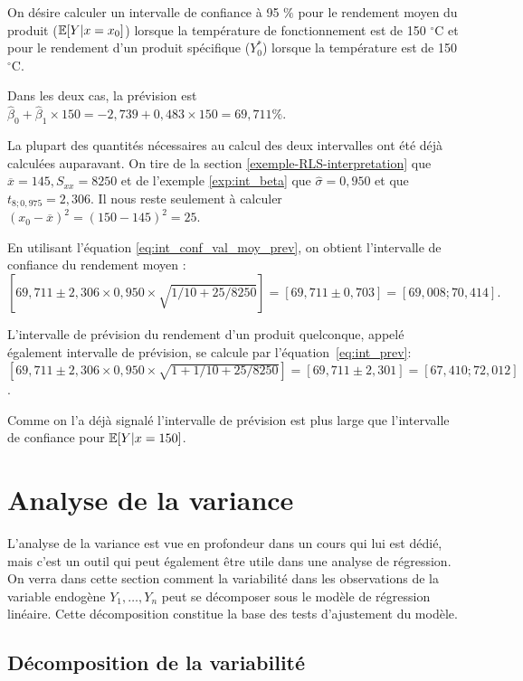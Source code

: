 \begin{exemple}
On désire calculer un intervalle de confiance à 95 $\%$ pour le rendement moyen du produit ($\mathbb{E}[Y|x=x_0]$) lorsque la température de fonctionnement est de 150 $^{\circ}\mathrm{C}$ et pour le rendement d'un produit spécifique (${Y}_0^*$) lorsque la température est de 150 $^{\circ}\mathrm{C}$.

Dans les deux cas, la prévision est $\hat\beta_0+ \hat\beta_1\times150 =-2,739+0,483\times 150=69,711 \%$.

La plupart des quantités nécessaires au calcul des deux intervalles ont été déjà calculées auparavant. On tire de la section \ref{exemple-RLS-interpretation}  que $\overline x=145, S_{xx}=8250$ et de l'exemple \ref{exp:int_beta} que $\hat\sigma=0,950$ et que $t_{8; 0,975}=2,306$. Il nous reste seulement à calculer $(x_0-\overline x)^2=(150-145)^2=25$.

En utilisant l'équation \eqref{eq:int_conf_val_moy_prev}, on obtient l'intervalle de confiance du rendement moyen :
$$[69,711\pm 2,306\times 0,950\times\sqrt{1/10+25/8250}]=[69,711 \pm 0,703]=[69,008;70,414].$$

L'intervalle de prévision du rendement d'un produit quelconque, appelé également intervalle de prévision, se calcule par l'équation~\eqref{eq:int_prev}: \\
 $[69,711\pm 2,306\times 0,950\times\sqrt{1+1/10+25/8250}]=[69,711\pm 2,301]=[67,410;72,012]$.

Comme on l'a déjà signalé l'intervalle de prévision est plus large que l'intervalle de confiance pour $\mathbb{E}[Y|x=150]$.
\end{exemple}


\section{Analyse de la variance}
\label{sec:AnalyseDeLaVariance}

L'analyse de la variance est vue en profondeur dans un cours qui lui est dédié, mais c'est un outil qui peut également être utile dans une analyse de régression. On verra dans cette section comment la variabilité dans les observations de la variable endogène $Y_1,\ldots,Y_n$ peut se décomposer sous le modèle de régression linéaire. Cette décomposition constitue la base des tests d'ajustement du modèle.

\subsection{Décomposition de la variabilité}

